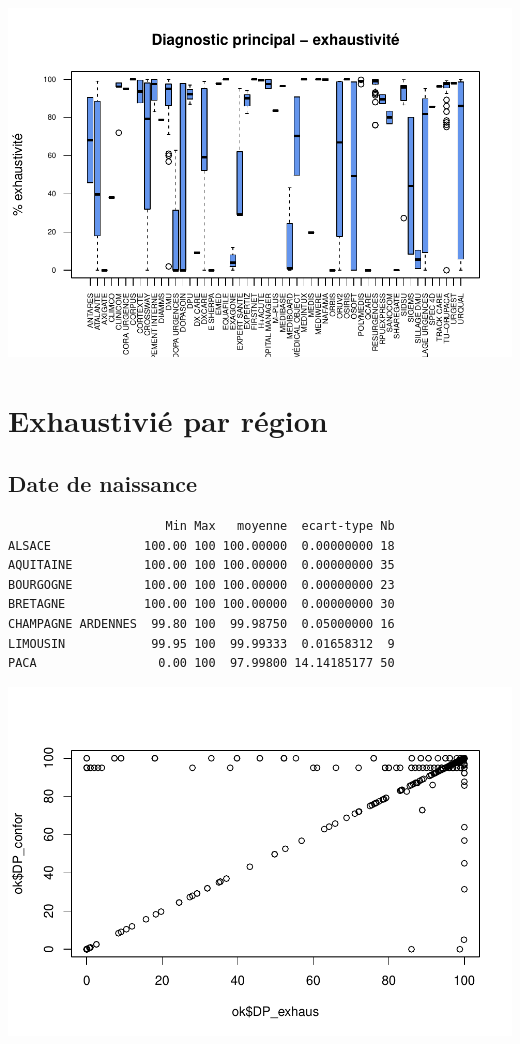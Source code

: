\documentclass[]{article}
\begin{document}
\includegraphics{septembre2015_files/figure-latex/unnamed-chunk-26-1.pdf}

\section{Exhaustivié par région}\label{exhaustivie-par-region}

\subsection{Date de naissance}\label{date-de-naissance-2}

\begin{verbatim}
                      Min Max   moyenne  ecart-type Nb
ALSACE             100.00 100 100.00000  0.00000000 18
AQUITAINE          100.00 100 100.00000  0.00000000 35
BOURGOGNE          100.00 100 100.00000  0.00000000 23
BRETAGNE           100.00 100 100.00000  0.00000000 30
CHAMPAGNE ARDENNES  99.80 100  99.98750  0.05000000 16
LIMOUSIN            99.95 100  99.99333  0.01658312  9
PACA                 0.00 100  97.99800 14.14185177 50
\end{verbatim}

\includegraphics{septembre2015_files/figure-latex/unnamed-chunk-27-1.pdf}
\end{document}
